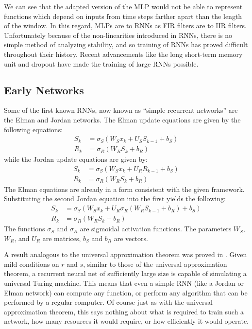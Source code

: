 We can see that the adapted version of the MLP would not be able to represent functions which depend on inputs from time steps farther apart than the length of the window.  In this regard, MLPs are to RNNs as FIR filters are to IIR filters.  Unfortunately because of the non-linearities introduced in RNNs, there is no simple method of analyzing stability, and so training of RNNs has proved difficult throughout their history.  Recent advancements like the long short-term memory unit and dropout have made the training of large RNNs possible.

\subsection{Early Networks}
Some of the first known RNNs, now known as ``simple recurrent networks'' are the Elman \cite{je90} and Jordan \cite{mj86} networks.  The Elman update equations are given by the following equations:
\begin{align}
S_k &= \sigma_S(W_Sx_k+U_SS_{k-1}+b_S\label{eq:elman_s})\\
R_k &= \sigma_R(W_RS_k+b_R)\label{eq:elman_y}
\end{align}
while the Jordan update equations are given by:
\begin{align}
S_k &= \sigma_S(W_Sx_k+U_R R_{k-1}+b_S) \label{eq:newj_s} \\
R_k &= \sigma_R(W_R S_k + b_R) \label{eq:newj_y}
\end{align}
The Elman equations are already in a form consistent with the given framework.  Substituting the second Jordan equation into the first yields the following:
\begin{align}
S_k &= \sigma_S(W_Sx_k+U_R \sigma_R(W_R S_{k-1} + b_R)+b_S)\label{eq:jordan_s}\\
R_k &= \sigma_R(W_R S_k + b_R) \label{eq:jordan_y}
\end{align}
The functions $\sigma_S$ and $\sigma_R$ are sigmoidal activation functions.  The parameters $W_S$,$W_R$, and $U_R$ are matrices, $b_S$ and $b_R$ are vectors.

A result analogous to the universal approximation theorem was proved in \cite{hs91}.  Given mild conditions on $r$ and $s$, similar to those of the universal approximation theorem, a recurrent neural net of sufficiently large size is capable of simulating a universal Turing machine.  This means that even a simple RNN (like a Jordan or Elman network) can compute any function, or perform any algorithm that can be performed by a regular computer.  Of course just as with the universal approximation theorem, this says nothing about what is required to train such a network, how many resources it would require, or how efficiently it would operate.

